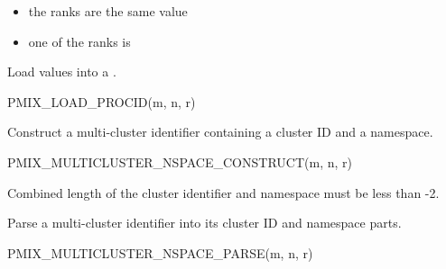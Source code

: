 \begin{itemize}
    \item the ranks are the same value
    \item one of the ranks is 
\end{itemize}



Load values into a .

\cspecificstart
\begin{codepar}
PMIX_LOAD_PROCID(m, n, r)
\end{codepar}
\cspecificend

\begin{arglist}
\end{arglist}


Construct a multi-cluster identifier containing a cluster ID and a namespace.

\cspecificstart
\begin{codepar}
PMIX_MULTICLUSTER_NSPACE_CONSTRUCT(m, n, r)
\end{codepar}
\cspecificend

\begin{arglist}
\end{arglist}

Combined length of the cluster identifier and namespace must be less than -2.


Parse a multi-cluster identifier into its cluster ID and namespace parts.

\cspecificstart
\begin{codepar}
PMIX_MULTICLUSTER_NSPACE_PARSE(m, n, r)
\end{codepar}
\cspecificend

